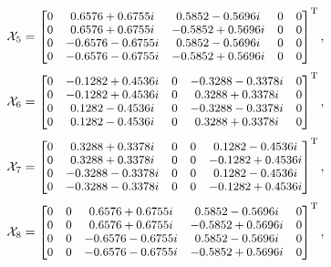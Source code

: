 \documentclass[journal]{IEEEtran}
\begin{document}
 \begin{equation}
  \footnotesize   
     \mathcal X_5=
\begin{bmatrix}
   0&  0.6576 + 0.6755i&  0.5852 - 0.5696i&  0&  0\\
   0&  0.6576 + 0.6755i& -0.5852 + 0.5696i&  0&  0\\
   0& -0.6576 - 0.6755i&  0.5852 - 0.5696i&  0&  0\\
   0& -0.6576 - 0.6755i& -0.5852 + 0.5696i&  0&  0\\
      \end{bmatrix}^{\text{T}}, \notag
  \end{equation}
\begin{equation}
  \footnotesize   
     \mathcal X_6=
\begin{bmatrix}
   0& -0.1282 + 0.4536i&  0& -0.3288 - 0.3378i&  0\\
   0& -0.1282 + 0.4536i&  0&  0.3288 + 0.3378i&  0\\
   0&  0.1282 - 0.4536i&  0& -0.3288 - 0.3378i&  0\\
   0&  0.1282 - 0.4536i&  0&  0.3288 + 0.3378i&  0\\
      \end{bmatrix}^{\text{T}}, \notag
  \end{equation}
\begin{equation}
  \footnotesize   
     \mathcal X_7=
\begin{bmatrix}
   0&  0.3288 + 0.3378i&  0&  0&  0.1282 - 0.4536i\\
   0&  0.3288 + 0.3378i&  0&  0& -0.1282 + 0.4536i\\
   0& -0.3288 - 0.3378i&  0&  0&  0.1282 - 0.4536i\\
   0& -0.3288 - 0.3378i&  0&  0& -0.1282 + 0.4536i\\
      \end{bmatrix}^{\text{T}}, \notag
  \end{equation}
\begin{equation}
  \footnotesize   
     \mathcal X_8=
\begin{bmatrix}
   0&  0&  0.6576 + 0.6755i&  0.5852 - 0.5696i&  0\\
   0&  0&  0.6576 + 0.6755i& -0.5852 + 0.5696i&  0\\
   0&  0& -0.6576 - 0.6755i&  0.5852 - 0.5696i&  0\\
   0&  0& -0.6576 - 0.6755i& -0.5852 + 0.5696i&  0\\
      \end{bmatrix}^{\text{T}}, \notag
  \end{equation}
\end{document}
